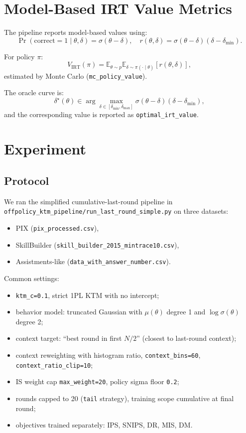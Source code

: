 \documentclass[11pt]{article}
\begin{document}
\section{Model-Based IRT Value Metrics}
The pipeline reports model-based values using:
\[
\Pr(\text{correct}=1\mid\theta,\delta)=\sigma(\theta-\delta),
\quad
r(\theta,\delta)=\sigma(\theta-\delta)(\delta-\delta_{\min}).
\]

For policy $\pi$:
\[
V_{\text{IRT}}(\pi)=\mathbb{E}_{\theta\sim p}\mathbb{E}_{\delta\sim\pi(\cdot\mid\theta)}[r(\theta,\delta)],
\]
estimated by Monte Carlo (\texttt{mc\_policy\_value}).

The oracle curve is:
\[
\delta^\star(\theta)\in\arg\max_{\delta\in[\delta_{\min},\delta_{\max}]}
\sigma(\theta-\delta)(\delta-\delta_{\min}),
\]
and the corresponding value is reported as \texttt{optimal\_irt\_value}.

\section{Experiment}
\subsection{Protocol}
We ran the simplified cumulative-last-round pipeline in
\texttt{offpolicy\_ktm\_pipeline/run\_last\_round\_simple.py} on three datasets:
\begin{itemize}
  \item PIX (\texttt{pix\_processed.csv}),
  \item SkillBuilder (\texttt{skill\_builder\_2015\_mintrace10.csv}),
  \item Assistments-like (\texttt{data\_with\_answer\_number.csv}).
\end{itemize}

Common settings:
\begin{itemize}
  \item \texttt{ktm\_c=0.1}, strict 1PL KTM with no intercept;
  \item behavior model: truncated Gaussian with $\mu(\theta)$ degree 1 and $\log\sigma(\theta)$ degree 2;
  \item context target: ``best round in first $N/2$'' (closest to last-round context);
  \item context reweighting with histogram ratio, \texttt{context\_bins=60}, \texttt{context\_ratio\_clip=10};
  \item IS weight cap \texttt{max\_weight=20}, policy sigma floor \texttt{0.2};
  \item rounds capped to 20 (\texttt{tail} strategy), training scope cumulative at final round;
  \item objectives trained separately: IPS, SNIPS, DR, MIS, DM.
\end{itemize}
\end{document}
